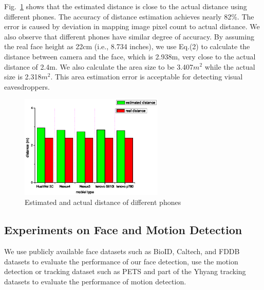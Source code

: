 Fig.~\ref{fig:distance-results} shows that the estimated distance is close to the actual distance using different phones.  The accuracy of distance estimation achieves nearly 82\%.
The error is caused by deviation in mapping image pixel count to actual distance.  We also observe that different phones have similar degree of accuracy.
By assuming the real face height  as 22cm (i.e., 8.734 inches), we use Eq.(2) to calculate the distance between camera and the face, which is 2.938m, very close to the actual distance of 2.4m.  We also calculate the area size to be 3.407$m^2$ while the actual size is 2.318$m^2$. This area estimation error is acceptable for detecting visual eavesdroppers.


\begin{figure}[H]\label{exp:expdistancechart}
\centering
\includegraphics[width=2.7in]{epsdistancechart1.eps}
\caption{Estimated and actual distance of different phones}
\label{fig:distance-results}
\end{figure}

\subsection{Experiments on Face and Motion Detection} %
We use  publicly available face datasets such as BioID\cite{BioID}, Caltech\cite{jesorsky2001robust}, and FDDB\cite{jain2010fddb} datasets to evaluate the performance of our face detection, use the motion detection or tracking dataset such as PETS\cite{website:PETS} and part of the Yhyang tracking datasets to evaluate the performance of motion detection.

